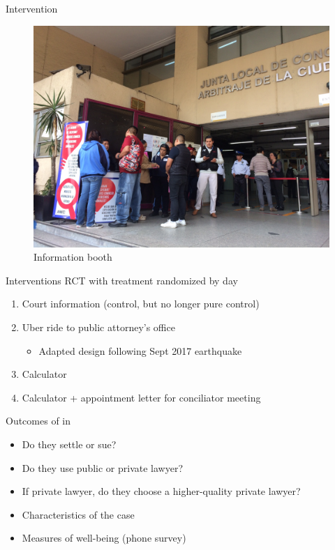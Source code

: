 \documentclass[8pt]{beamer}
\begin{document}
 \begin{frame}{Intervention}

\begin{figure}[H]
    \caption{Information booth}
    \begin{center}
    \includegraphics[width=1\textwidth]{presentations/IMG_1437.jpg}
    \end{center}
\end{figure}
\end{frame}

\begin{frame}{Interventions}
RCT with treatment randomized by day
\begin{enumerate}
    \item Court information (control, but no longer pure control)
    \item Uber ride to public attorney's office
    \begin{itemize}
        \item Adapted design following Sept 2017 earthquake
    \end{itemize}
    \item Calculator 
    \item Calculator + appointment letter for conciliator meeting
\end{enumerate}
Outcomes of in\begin{itemize}
    \item Do they settle or sue?
    \item Do they use public or private lawyer?
    \item If private lawyer, do they choose a higher-quality private lawyer?
    \item Characteristics of the case
    \item Measures of well-being (phone survey)
\end{itemize}
\end{frame}
 
\end{document}
